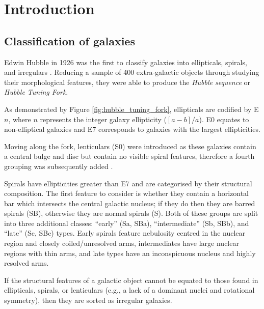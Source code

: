 \documentclass[12pt, twocolumn, nofootinbib]{revtex4-1}    %
\begin{document}

\null\newpage
\null\newpage
\tableofcontents
\newpage

\section{Introduction} 
\subsection{Classification of galaxies} \label{test}
\noindent
Edwin Hubble in 1926 was the first to classify galaxies into ellipticals, spirals, and irregulars \citep{1926ApJ....64..321H}. Reducing a sample of 400 extra-galactic objects through studying their morphological features, they were able to produce the \textit{Hubble sequence} or \textit{Hubble Tuning Fork}.

As demonstrated by Figure \ref{fig:hubble_tuning_fork}, ellipticals are codified by E$n$, where $n$ represents the integer galaxy ellipticity ($[a-b]/a$). E0 equates to non-elliptical galaxies and E7 corresponds to galaxies with the largest ellipticities. 

Moving along the fork, lenticulars (S0) were introduced as these galaxies contain a central bulge and disc but contain no visible spiral features, therefore a fourth grouping was subsequently added \citep{1961hag..book.....S, 1975gaun.book....1S, 1994cag..book.....S}. 

Spirals have ellipticities greater than E7 and are categorised by their structural composition. The first feature to consider is whether they contain a horizontal bar which intersects the central galactic nucleus; if they do then they are barred spirals (SB), otherwise they are normal spirals (S). Both of these groups are split into three additional classes: ``early'' (Sa, SBa), ``intermediate'' (Sb, SBb), and ``late'' (Sc, SBc) types. Early spirals feature nebulosity centred in the nuclear region and closely coiled/unresolved arms, intermediates have large nuclear regions with thin arms, and late types have an inconspicuous nucleus and highly resolved arms.  

If the structural features of a galactic object cannot be equated to those found in ellipticals, spirals, or lenticulars (e.g., a lack of a dominant nuclei and rotational symmetry), then they are sorted as irregular galaxies.
\end{document}
